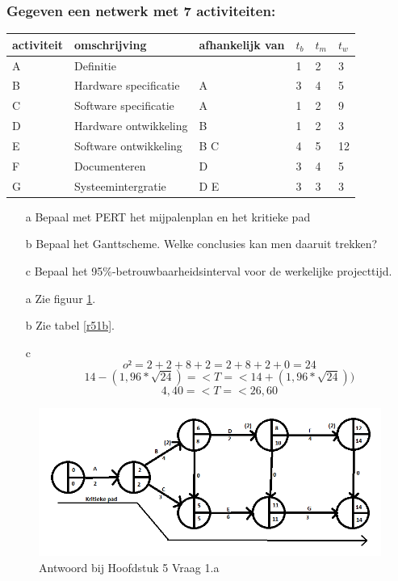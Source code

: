 \documentclass[a4paper,titlepage]{artikel1}
\begin{document}
   \subsubsection[Opdracht 1]{Gegeven een netwerk met 7 activiteiten:}
   \begin{center}
     \begin{tabular}{|l|l|l|l|l|l|}
       \hline
       activiteit & omschrijving & afhankelijk van & $t_b$ & $t_m$ & $t_w$ \\
       \hline
       A & Definitie & & 1 & 2 & 3 \\
       B & Hardware specificatie & A & 3 & 4 & 5 \\
       C & Software specificatie & A & 1 & 2 & 9 \\
       D & Hardware ontwikkeling & B & 1 & 2 & 3 \\
       E & Software ontwikkeling & B C & 4 & 5 & 12 \\
       F & Documenteren & D & 3 & 4 & 5 \\
       G & Systeemintergratie & D E & 3 & 3 & 3 \\
       \hline
     \end{tabular}
   \end{center}
   \begin{itemize}
     \item[a] Bepaal met PERT het mijpalenplan en het kritieke pad
     \item[b] Bepaal het Ganttscheme. Welke conclusies kan men daaruit trekken?
     \item[c] Bepaal het 95\%-betrouwbaarheidsinterval voor de werkelijke projecttijd.
   \end{itemize}
   \begin{itemize}
     \item[a] Zie figuur \ref{r51a}.
     \item[b] Zie tabel \ref{r51b}.
     \item[c]
       \begin{displaymath}
         o²=2+2+8+2=2+8+2+0=24
       \end{displaymath}
       \begin{displaymath}
         14-(1,96*\sqrt{24})=<T=<14+(1,96*\sqrt{24}))
       \end{displaymath}
       \begin{displaymath}
         4,40=<T=<26,60
       \end{displaymath}
   \end{itemize}
       \begin{figure}[tbh]
         \caption{Antwoord bij Hoofdstuk 5 Vraag 1.a} \label{r51a}
         \includegraphics[scale=0.75]{H5O1A.png}     
       \end{figure}
\end{document}
